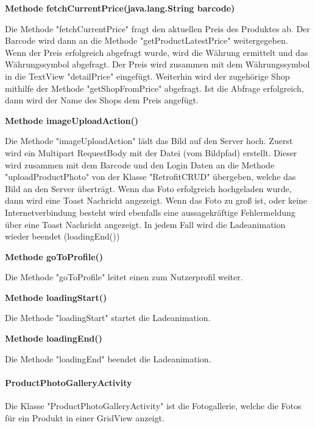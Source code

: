 \documentclass{scrartcl}
\begin{document}
\noindent\textbf{Methode fetchCurrentPrice(java.lang.String barcode)} 

\noindent Die Methode "fetchCurrentPrice" fragt den aktuellen Preis des Produktes ab. Der Barcode wird dann an die Methode "getProductLatestPrice" weitergegeben. Wenn der Preis erfolgreich abgefragt wurde, wird die Währung ermittelt und das Währungssymbol abgefragt. Der Preis wird zusammen mit dem Währungssymbol in die TextView "detailPrice" eingefügt. Weiterhin wird der zugehörige Shop mithilfe der Methode "getShopFromPrice" abgefragt. Ist die Abfrage erfolgreich, dann wird der Name des Shops dem Preis angefügt. \newline

\noindent\textbf{Methode imageUploadAction()} 

\noindent Die Methode "imageUploadAction" lädt das Bild auf den Server hoch. Zuerst wird ein Multipart RequestBody mit der Datei (vom Bildpfad) erstellt. Dieser wird zusammen mit dem Barcode und den Login Daten an die Methode "uploadProductPhoto" von der Klasse "RetrofitCRUD" übergeben, welche das Bild an den Server überträgt. Wenn das Foto erfolgreich hochgeladen wurde, dann wird eine Toast Nachricht angezeigt. Wenn das Foto zu groß ist, oder keine Internetverbindung besteht wird ebenfalls eine aussagekräftige Fehlermeldung über eine Toast Nachricht angezeigt. In jedem Fall wird die Ladeanimation wieder beendet (loadingEnd()) \newline 

\noindent\textbf{Methode goToProfile()} 

\noindent Die Methode "goToProfile" leitet einen zum Nutzerprofil weiter. \newline

\noindent\textbf{Methode loadingStart()}

\noindent Die Methode "loadingStart" startet die Ladeanimation. \newline

\noindent\textbf{Methode loadingEnd()}

\noindent Die Methode "loadingEnd" beendet die Ladeanimation. \newline

\paragraph{ProductPhotoGalleryActivity}
Die Klasse "ProductPhotoGalleryActivity" ist die Fotogallerie, welche die Fotos für ein Produkt in einer GridView anzeigt. \newline 
\end{document}
